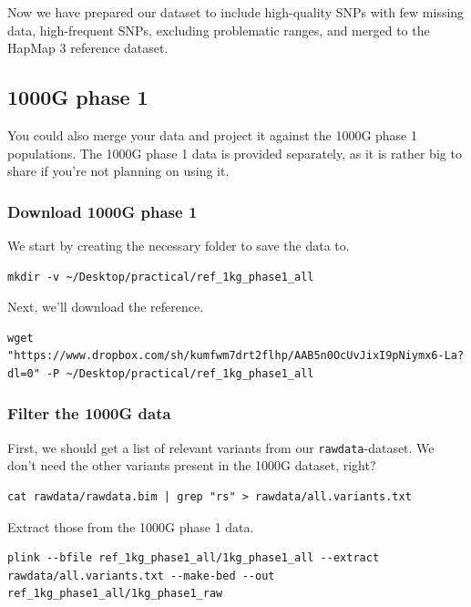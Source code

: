 \documentclass[
]{book}
\begin{document}
Now we have prepared our dataset to include high-quality SNPs with few missing data, high-frequent SNPs, excluding problematic ranges, and merged to the HapMap 3 reference dataset.

\hypertarget{g-phase-1}{%
\subsection{1000G phase 1}\label{g-phase-1}}

You could also merge your data and project it against the 1000G phase 1 populations. The 1000G phase 1 data is provided separately, as it is rather big to share if you're not planning on using it.

\hypertarget{download-1000g-phase-1}{%
\subsubsection{Download 1000G phase 1}\label{download-1000g-phase-1}}

We start by creating the necessary folder to save the data to.

\begin{verbatim}
mkdir -v ~/Desktop/practical/ref_1kg_phase1_all
\end{verbatim}

Next, we'll download the reference.

\begin{verbatim}
wget "https://www.dropbox.com/sh/kumfwm7drt2flhp/AAB5n0OcUvJixI9pNiymx6-La?dl=0" -P ~/Desktop/practical/ref_1kg_phase1_all
\end{verbatim}

\hypertarget{filter-the-1000g-data}{%
\subsubsection{Filter the 1000G data}\label{filter-the-1000g-data}}

First, we should get a list of relevant variants from our \texttt{rawdata}-dataset. We don't need the other variants present in the 1000G dataset, right?

\begin{verbatim}
cat rawdata/rawdata.bim | grep "rs" > rawdata/all.variants.txt
\end{verbatim}

Extract those from the 1000G phase 1 data.

\begin{verbatim}
plink --bfile ref_1kg_phase1_all/1kg_phase1_all --extract rawdata/all.variants.txt --make-bed --out ref_1kg_phase1_all/1kg_phase1_raw
\end{verbatim}
\end{document}
